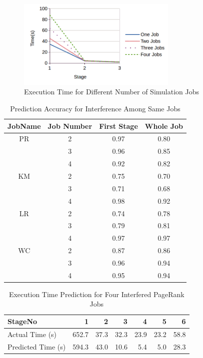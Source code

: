 \begin{figure}[!t]
\centering
\captionsetup{justification=centering}
\includegraphics[width=3in]{simjobs.png}
\caption{Execution Time for Different Number of Simulation Jobs}
\label{simjobs}
\end{figure}

\begin{table}[!htb]
\renewcommand{\arraystretch}{1.3}
\caption{Prediction Accuracy for Interference Among Same Jobs}
\label{table_samejob}
\centering
\begin{tabular}{c|c|c|c}
\hline
\bfseries JobName & \bfseries Job Number & \bfseries First Stage & \bfseries Whole Job\\
\hline\hline
PR & 2 & 0.97 & 0.80\\
& 3 & 0.96 & 0.85\\
& 4 & 0.92 & 0.82\\
\hline
KM & 2 & 0.75 & 0.70\\
& 3 & 0.71 & 0.68\\
& 4 & 0.98 & 0.92\\
\hline
LR & 2 & 0.74 & 0.78\\
& 3 & 0.79 & 0.81\\
& 4 & 0.97 & 0.97 \\
\hline
WC & 2 & 0.87 & 0.86\\
& 3 & 0.96 & 0.94\\
& 4 & 0.95 & 0.94\\
\hline
\end{tabular}
\end{table}


\begin{table}[!htb]
\renewcommand{\arraystretch}{1.3}
\caption{Execution Time Prediction for Four Interfered PageRank Jobs}
\label{pr20gprIII}
\centering
\begin{tabular}{l|r|r|r|r|r|r}
\hline
\bfseries StageNo & \bfseries 1 & \bfseries 2 & \bfseries 3 & \bfseries 4 & \bfseries 5 & \bfseries 6 \\
\hline \hline
Actual Time (s)
& 652.7
& 37.3 
& 32.3 
& 23.9 
& 23.2
& 58.8 \\
\hline
Predicted Time (s) 
& 594.3 
& 43.0 
& 10.6
& 5.4 
& 5.0 
& 28.3 \\
\hline
\end{tabular}
\end{table}

